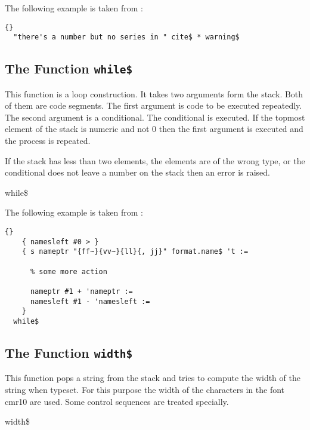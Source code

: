 The following example is taken from :

\begin{lstlisting}{}
  "there's a number but no series in " cite$ * warning$ 
\end{lstlisting}%


\subsection{The Function \texttt{while\$}}%

This function is a loop construction. It takes two arguments form the
stack. Both of them are code segments. The first argument is code to
be executed repeatedly. The second argument is a conditional. The
conditional is executed. If the topmost element of the stack is
numeric and not 0 then the first argument is executed and the process
is repeated.

If the stack has less than two elements, the elements are of the
wrong type, or the conditional does not leave a number on the stack
then an error is raised.

\begin{BstFunction}{while\$}
\end{BstFunction}

The following example is taken from :

\begin{lstlisting}{}
    { namesleft #0 > }
    { s nameptr "{ff~}{vv~}{ll}{, jj}" format.name$ 't :=

      % some more action

      nameptr #1 + 'nameptr :=
      namesleft #1 - 'namesleft :=
    }
  while$
\end{lstlisting}%
\fctIndex{+}\fctIndex{-}\fctIndex{>}%
\fctIndex{:=}


\subsection{The Function \texttt{width\$}}%

This function pops a string from the stack and tries to compute the
width of the string when typeset. For this purpose the width of the
characters in the font cmr10 are used. Some control sequences are
treated specially.

\begin{BstFunction}{width\$}
\end{BstFunction}

